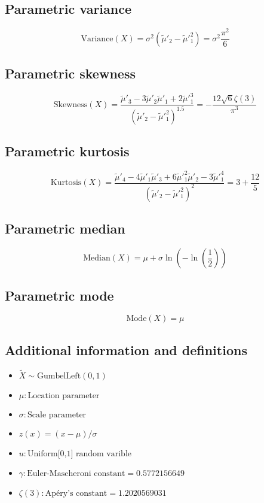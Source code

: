 \documentclass{article}
\begin{document}
\subsection{Parametric variance}
\begin{equation*} \mathrm{Variance}(X)=\sigma^{2}(\tilde{\mu}'_{2}-\tilde{\mu}'^{2}_{1})=\sigma^{2}\frac{\pi^{2}}{6} \end{equation*}
\subsection{Parametric skewness}
\begin{equation*} \mathrm{Skewness}(X)=\frac{\tilde{\mu}'_{3}-3\tilde{\mu}'_{2}\tilde{\mu}'_{1}+2\tilde{\mu}'^{3}_{1}}{(\tilde{\mu}'_{2}-\tilde{\mu}'^{2}_{1})^{1.5}}=-\frac{12\sqrt{6}\zeta(3)}{\pi^{3}} \end{equation*}
\subsection{Parametric kurtosis}
\begin{equation*} \mathrm{Kurtosis}(X)=\frac{\tilde{\mu}'_{4}-4\tilde{\mu}'_{1}\tilde{\mu}'_{3}+6\tilde{\mu}'^{2}_{1}\tilde{\mu}'_{2}-3\tilde{\mu}'^{4}_{1}}{(\tilde{\mu}'_{2}-\tilde{\mu}'^{2}_{1})^{2}}=3+\frac{12}{5} \end{equation*}
\subsection{Parametric median}
\begin{equation*} \mathrm{Median}(X)=\mu+\sigma\ln\left(-\ln\left(\frac{1}{2}\right)\right) \end{equation*}
\subsection{Parametric mode}
\begin{equation*} \mathrm{Mode}(X)=\mu \end{equation*}
\subsection{Additional information and definitions}
\begin{itemize}
    \item $ \tilde{X}\sim\mathrm{GumbelLeft}\left(0,1\right) $
    \item $ \mu:\text{Location parameter} $
    \item $ \sigma:\text{Scale parameter} $
    \item $ z\left(x\right)=\left(x-\mu\right)/\sigma $
    \item $ u:\text{Uniform[0,1] random varible} $
    \item $ \gamma:\text{Euler-Mascheroni constant}=0.5772156649 $
    \item $ \zeta(3):\text{Apéry's constant}=1.2020569031 $
\end{itemize}
\end{document}
